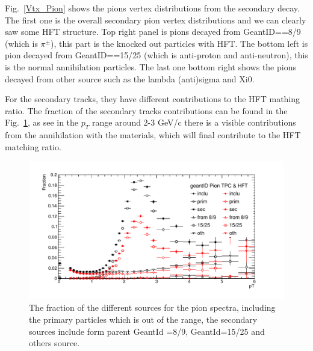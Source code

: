 Fig.~\ref{Vtx_Pion} shows the pions vertex distributions from the secondary decay. The first one is the overall secondary pion vertex distributions and we can clearly saw some HFT structure. Top right panel is pions decayed from GeantID==8/9 (which is $\pi^{\pm}$), this part is the knocked out particles with HFT. The bottom left is pion decayed from GeantID==15/25 (which is anti-proton and anti-neutron), this is the normal annihilation particles. The last one bottom right shows the pions decayed from other source such as the lambda (anti)sigma and Xi0.

For the secondary tracks, they have different contributions to the HFT mathing ratio. The fraction of the secondary tracks contributions can be found in the Fig.~\ref{Fraction_Pion}, as see in the $p_{T}$ range around 2-3 GeV/c there is a visible contributions from the annihilation with the materials, which will final contribute to the HFT matching ratio.

\begin{figure}[htbp]
\centering
\includegraphics[keepaspectratio,width=1.0\textwidth,angle=0]{figure/Run14_D0HFT/Fraction_Pion-eps-converted-to.pdf}
\caption{The fraction of the different sources for the pion spectra, including the primary particles which is out of the range, the secondary sources include form parent GeantId =8/9, GeantId=15/25 and others source.}
\label{Fraction_Pion}
\end{figure}

